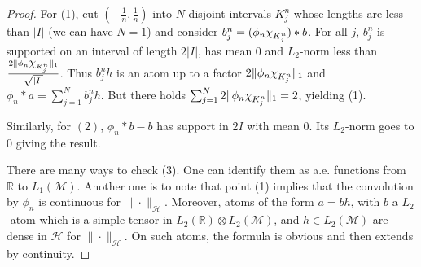 \documentclass[psamsfonts]{amsart}
\newcommand{\R}{\mathbb{R}}
\newcommand*{\bigchi}{\mbox{\large$\chi$}}
\newcommand{\Lone}{L_1}
\newcommand{\Ltwo}{L_2}
\begin{document}
    \begin{proof}
     
      For (1), cut $(-\frac 1 n,\frac 1n)$ into
      $N$ disjoint intervals $K_j^n$ whose lengths are less than $|I|$ (we
      can have $N=1$) and consider $b_j^n=(\phi_n\bigchi_{K_j^n})*b$. For
      all $j$, $b_j^n$ is supported on an interval of length $2|I|$, has mean 0 and $L_2$-norm less than
      $\frac {2\|\phi_n\bigchi_{K_j^n}\|_1} {\sqrt{|I|}}$. Thus $b_j^n h$ is
      an atom up to a factor $2\|\phi_n\bigchi_{K_j^n}\|_1$ and
      $\phi_n * a=\sum_{j=1}^N b_j^n h$. But there holds
      $\sum_{j=1}^N 2\|\phi_n\bigchi_{K_j^n}\|_1=2$, yielding (1).

      Similarly, for $(2)$, $\phi_n*b-b$ has support in $2I$ with mean
      $0$. Its $\Ltwo$-norm goes to $0$ giving the result. 

      There are many ways to check (3). One can identify them as
      a.e. functions from $\R$ to $\Lone(\mathcal M)$. Another one is to
      note that point (1) implies that the convolution by $\phi_n$ is
      continuous for $\|\cdot\|_{\mathcal H}$. Moreover, atoms of the form
      $a=bh$, with $b$ a $\Ltwo$-atom which is a simple tensor in
      $\Ltwo(\R)\otimes \Ltwo(\mathcal M)$, and
      $h\in \Ltwo(\mathcal M)$ are dense in $\mathcal H$ for
      $\|\cdot\|_{\mathcal H}$.  On such atoms, the formula is obvious
      and then extends by continuity.
    \end{proof}
\end{document}
